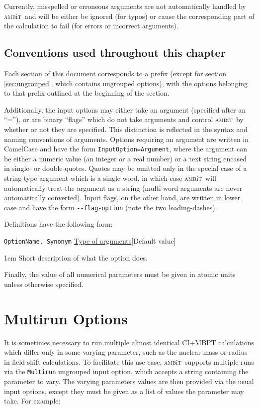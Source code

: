 \documentclass{report}
\newcommand{\ambit}{\textsc{amb}{\footnotesize i}\textsc{t}}
\begin{document}
Currently, misspelled or erroneous arguments are not automatically handled by \ambit\ 
and will be either be ignored (for typos) or cause the corresponding part of the calculation to fail 
(for errors or incorrect arguments).

\subsection{Conventions used throughout this chapter}

Each section of this document corresponds to a prefix (except for section \ref{sec:ungrouped}, which
contains ungrouped options), with the options belonging to that prefix outlined at the beginning of the
section. 

Additionally, the input options may either take an argument (specified after an ``=''), or are binary
``flags'' which do not take arguments and control \ambit\ by whether or not they are specified. This
distinction is reflected in the syntax and naming conventions of arguments. Options requiring an
argument are written in CamelCase and have the form \texttt{InputOption=Argument}, where the argument
can be either a numeric value (an integer or a real number) or a text string encased in single- or
double-quotes. Quotes may be omitted only in the special case of a string-type argument which is a
single word, in which case \ambit\ will automatically treat the argument as a string (multi-word
arguments are never automatically converted). Input flags, on the other hand, are written in lower case 
and have the form \texttt{{-}{-}flag-option} (note the two leading-dashes). 

Definitions have the following form:

\texttt{OptionName, Synonym} \uline{Type of arguments}[Default value]
\begin{adjustwidth}{1cm}{}
Short description of what the option does.
\end{adjustwidth}

Finally, the value of all numerical parameters must be given in atomic units unless otherwise specified.

\section{Multirun Options}

\label{sec:multirun}

It is sometimes necessary to run multiple almost identical CI+MBPT calculations which differ only in
some varying parameter, such as the nuclear mass or radius in field-shift calculations. To facilitate
this use-case, \ambit\ supports multiple runs via the \texttt{Multirun} ungrouped input option, which
accepts a string containing the parameter to vary. The varying parameters values are then provided via 
the usual input options, except they must be given as a list of values the parameter may take. For 
example:
\end{document}
